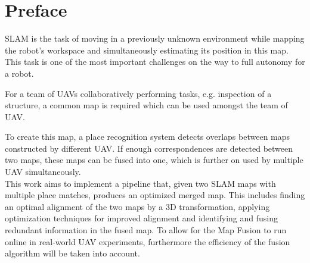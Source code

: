 \chapter*{Preface}

\ac{SLAM} is the task of moving in a previously unknown environment while mapping the robot’s workspace and simultaneously estimating its position in this map. This task is one of the most important challenges on the way to full autonomy for a robot.

For a team of \acp{UAV} collaboratively performing tasks, e.g. inspection of a structure, a common map is required which can be used amongst the team of \ac{UAV}.

To create this map, a place recognition system detects overlaps between maps constructed by different \ac{UAV}. If enough correspondences are detected between two maps, these maps can be fused into one, which is further on used by multiple \ac{UAV} simultaneously.\\

This work aims to implement a pipeline that, given two SLAM maps with multiple place matches, produces an optimized merged map. This includes finding an optimal alignment of the two maps by a 3D transformation, applying optimization techniques for improved alignment and identifying and fusing redundant information in the fused map. To allow for the Map Fusion to run online in real-world UAV experiments, furthermore the efficiency of the fusion algorithm will be taken into account.
